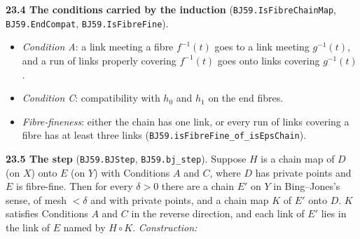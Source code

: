 \documentclass[11pt]{article}
\newcommand{\lean}[1]{\texttt{#1}}
\begin{document}
\textbf{23.4 The conditions carried by the induction} (\lean{BJ59.\hspace{0pt}IsFibreChainMap}, \lean{BJ59.\hspace{0pt}EndCompat}, \lean{BJ59.\hspace{0pt}IsFibreFine}).

\begin{itemize}
  \item \emph{Condition A}: a link meeting a fibre $f^{-1}(t)$ goes to a link meeting $g^{-1}(t)$, and a run of links properly covering $f^{-1}(t)$ goes onto links covering $g^{-1}(t)$.
  \item \emph{Condition C}: compatibility with $h_0$ and $h_1$ on the end fibres.
  \item \emph{Fibre-fineness}: either the chain has one link, or every run of links covering a fibre has at least three links (\lean{BJ59.\hspace{0pt}isFibreFine\_\hspace{0pt}of\_\hspace{0pt}isEpsChain}).
\end{itemize}

\textbf{23.5 The step} (\lean{BJ59.\hspace{0pt}BJStep}, \lean{BJ59.\hspace{0pt}bj\_\hspace{0pt}step}). Suppose $H$ is a chain map of $D$ (on $X$) onto $E$ (on $Y$) with Conditions $A$ and $C$, where $D$ has private points and $E$ is fibre-fine. Then for every $\delta > 0$ there are a chain $E'$ on $Y$ in Bing--Jones's sense, of mesh $< \delta$ and with private points, and a chain map $K$ of $E'$ onto $D$. $K$ satisfies Conditions $A$ and $C$ in the reverse direction, and each link of $E'$ lies in the link of $E$ named by $H \circ K$. \emph{Construction:}
\end{document}
